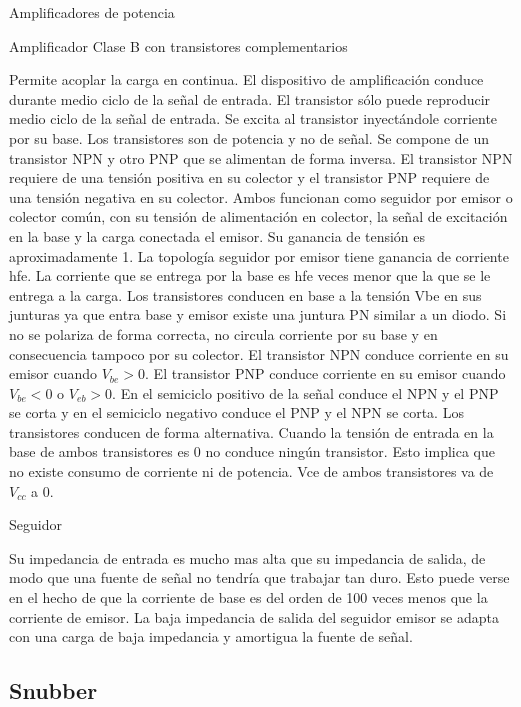Amplificadores de potencia

Amplificador Clase B con transistores complementarios

Permite acoplar la carga en continua. 
El dispositivo de amplificación conduce durante medio ciclo de la señal de entrada. 
El transistor sólo puede reproducir medio ciclo de la señal de entrada. 
Se excita al transistor inyectándole corriente por su base.
Los transistores son de potencia y no de señal. 
Se compone de un transistor NPN y otro PNP que se alimentan de forma inversa.
El transistor NPN requiere de una tensión positiva en su colector y 
el transistor PNP requiere de una tensión negativa en su colector.
Ambos funcionan como seguidor por emisor o colector común, con su tensión de alimentación en colector, la señal de excitación en la base y la carga conectada el emisor. 
Su ganancia de tensión es aproximadamente 1. 
La topología seguidor por emisor tiene ganancia de corriente hfe. 
La corriente que se entrega por la base es hfe veces menor que la que se le entrega a la carga. 
Los transistores conducen en base a la tensión Vbe en sus junturas ya que entra base y emisor existe una juntura PN similar a un diodo. 
Si no se polariza de forma correcta, no circula corriente por su base y en consecuencia tampoco por su colector. 
El transistor NPN conduce corriente en su emisor cuando $V_{be}>0$. 
El transistor PNP conduce corriente en su emisor cuando $V_{be}<0$ o $V_{eb}>0$.
En el semiciclo positivo de la señal conduce el NPN y el PNP se corta y en el semiciclo negativo conduce el PNP y el NPN se corta. 
Los transistores conducen de forma alternativa. 
Cuando la tensión de entrada en la base de ambos transistores es 0 no conduce ningún transistor. 
Esto implica que no existe consumo de corriente ni de potencia. 
Vce de ambos transistores va de $V_{cc}$ a 0.

Seguidor

Su impedancia de entrada es mucho mas alta que su impedancia de salida, de modo que una fuente de señal no tendría que trabajar tan duro.
 Esto puede verse en el hecho de que la corriente de base es del orden de 100 veces menos que la corriente de emisor. 
 La baja impedancia de salida del seguidor emisor se adapta con una carga de baja impedancia y amortigua la fuente de señal.

\subsection{Snubber}


